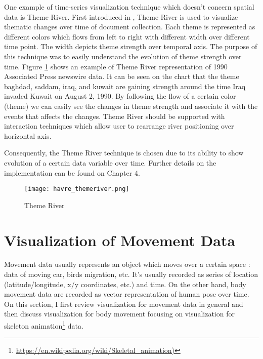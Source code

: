 One example of time-series visualization technique which doesn't concern spatial data is Theme River. First introduced in \cite{havre}, Theme River is used to visualize thematic changes over time of document collection. Each theme is represented as different colors which flows from left to right with different width over different time point. The width depicts theme strength over temporal axis. The purpose of this technique was to easily understand the evolution of theme strength over time. Figure \ref{themeriver} shows an example of Theme River representation of 1990 Associated Press newswire data. It can be seen on the chart that the theme baghdad, saddam, iraq, and kuwait are gaining strength  around the time Iraq invaded Kuwait on August 2, 1990. By following the flow of a certain color (theme) we can easily see the changes in theme strength and associate it with the events that affects the changes. Theme River should be supported with interaction techniques which allow user to rearrange river positioning over horizontal axis. 

Consequently, the Theme River technique is chosen due to its ability to show evolution of a certain data variable over time. Further details on the implementation can be found on Chapter 4.

\begin{figure}
\centering
\texttt{[image: havre\_themeriver.png]}
\caption{Theme River}
\label{themeriver}
\end{figure}


\section{Visualization of Movement Data}

Movement data usually represents an object which moves over a certain space \cite{adrienko_book}: data of moving car, birds migration, etc. It's usually recorded as series of location (latitude/longitude, x/y coordinates, etc.) and time. On the other hand, body movement data are recorded as vector representation of human pose \cite{bernard2013} over time. On this section, I first review visualization for movement data in general and then discuss visualization for body movement focusing on visualization for skeleton animation\footnote{\url{https://en.wikipedia.org/wiki/Skeletal_animation)}} data.

